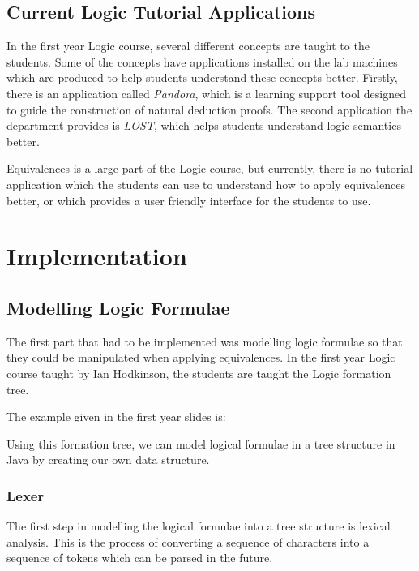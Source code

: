 \documentclass{report}
\begin{document}
\section{Current Logic Tutorial Applications}

In the first year Logic course, several different concepts are taught to the students.
Some of the concepts have applications installed on the lab machines which are produced
to help students understand these concepts better. Firstly, there is an application
called \emph{Pandora}, which is a learning support tool designed to guide the
construction of natural deduction proofs. The second application the department
provides is \emph{LOST}, which helps students understand logic semantics better. 

Equivalences is a large part of the Logic course, but currently, there is no
tutorial application which the students can use to understand how to apply
equivalences better, or which provides a user friendly interface for the students 
to use. 


\chapter{Implementation}

\section{Modelling Logic Formulae}

The first part that had to be implemented was modelling logic formulae so that
they could be manipulated when applying equivalences. In the first year Logic course
taught by Ian Hodkinson, the students are taught the Logic formation tree.

The example given in the first year slides is:

Using this formation tree, we can model logical formulae in a tree structure in
Java by creating our own data structure.

\subsection{Lexer}

The first step in modelling the logical formulae into a tree structure is lexical 
analysis. This is the process of converting a sequence of characters into a sequence
of tokens which can be parsed in the future.
\end{document}
